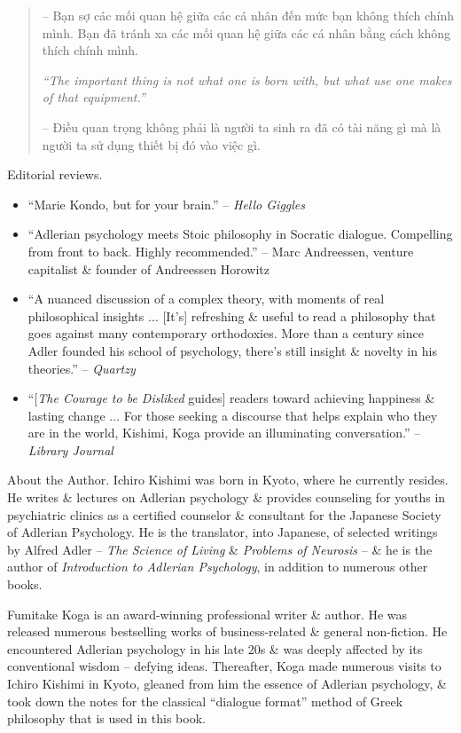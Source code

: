 \documentclass{article}
\begin{document}
\begin{enumerate}
\begin{quotation}
		-- Bạn sợ các mối quan hệ giữa các cá nhân đến mức bạn không thích chính mình. Bạn đã tránh xa các mối quan hệ giữa các cá nhân bằng cách không thích chính mình.

		{\it``The important thing is not what one is born with, but what use one makes of that equipment.''}

		-- Điều quan trọng không phải là người ta sinh ra đã có tài năng gì mà là người ta sử dụng thiết bị đó vào việc gì.
	\end{quotation}
	{\sf Editorial reviews.}
	\begin{itemize}
		\item ``{\sc Marie Kondo}, but for your brain.'' -- {\it Hello Giggles}
		\item ``Adlerian psychology meets Stoic philosophy in Socratic dialogue. Compelling from front to back. Highly recommended.'' -- {\sc Marc Andreessen}, venture capitalist \& founder of Andreessen Horowitz
		\item ``A nuanced discussion of a complex theory, with moments of real philosophical insights $\ldots$ [It's] refreshing \& useful to read a philosophy that goes against many contemporary orthodoxies. More than a century since {\sc Adler} founded his school of psychology, there's still insight \& novelty in his theories.'' -- {\it Quartzy}
		\item ``[{\it The Courage to be Disliked} guides] readers toward achieving happiness \& lasting change $\ldots$ For those seeking a discourse that helps explain who they are in the world, {\sc Kishimi, Koga} provide an illuminating conversation.'' -- {\it Library Journal}
	\end{itemize}
	{\sf About the Author.} {\sc Ichiro Kishimi} was born in Kyoto, where he currently resides. He writes \& lectures on Adlerian psychology \& provides counseling for youths in psychiatric clinics as a certified counselor \& consultant for the Japanese Society of Adlerian Psychology. He is the translator, into Japanese, of selected writings by {\sc Alfred Adler} -- {\it The Science of Living} \& {\it Problems of Neurosis} -- \& he is the author of {\it Introduction to Adlerian Psychology}, in addition to numerous other books.

	{\sc Fumitake Koga} is an award-winning professional writer \& author. He was released numerous bestselling works of business-related \& general non-fiction. He encountered Adlerian psychology in his late 20s \& was deeply affected by its conventional wisdom -- defying ideas. Thereafter, {\sc Koga} made numerous visits to {\sc Ichiro Kishimi} in Kyoto, gleaned from him the essence of Adlerian psychology, \& took down the notes for the classical ``dialogue format'' method of Greek philosophy that is used in this book.


\end{enumerate}
\end{document}

